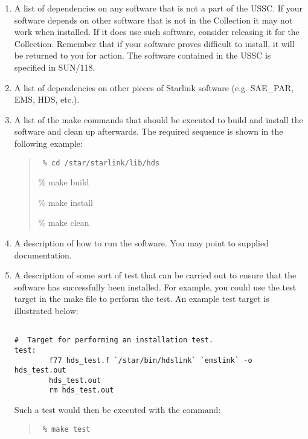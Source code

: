 \begin{enumerate}
\begin{itemize}
\end{itemize}

Full details of the usage and structure of Starlink make files (including an
annotated example make file for packages) can be found in SSN/66.

\item A list of dependencies on any software that is not a part
of the USSC.
If your software depends on other software that is not in the Collection it
may not work when installed.
If it does use such software, consider releasing it for the Collection.
Remember that if your software proves difficult to install, it will be returned
to you for action.
The software contained in the USSC is specified in SUN/118.

\item A list of dependencies on other pieces of Starlink software (e.g.
SAE\_PAR, EMS, HDS, etc.).

\item A list of the make commands that should be executed to build and install
the software and clean up afterwards. The required sequence is shown in the
following example:

\begin{quote}
{\tt
\% cd /star/starlink/lib/hds

\% make build

\% make install

\% make clean
}
\end{quote}

\item A description of how to run the software. You may point to supplied
documentation.

\item A description of some sort of test that can be carried out to ensure
that the software has successfully been installed. For example, you could
use the test target in the make file to perform the test. An example
test target is illustrated below:

\begin{verbatim}

#  Target for performing an installation test.
test:
        f77 hds_test.f `/star/bin/hdslink` `emslink` -o hds_test.out
        hds_test.out
        rm hds_test.out

\end{verbatim}


Such a test would then be executed with the command:

\begin{quote}
{\tt
\% make test
}
\end{quote}


\end{enumerate}
